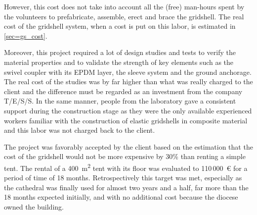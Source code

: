 However, this cost does not take into account all the (free) man-hours spent by the volunteers to prefabricate, assemble, erect and brace the gridshell. The real cost of the gridshell system, when a cost is put on this labor, is estimated in \cref{sec=gs_cost}.

Moreover, this project required a lot of design studies and tests to verify the material properties and to validate the strength of key elements such as the swivel coupler with its EPDM layer, the sleeve system and the ground anchorage. The real cost of the studies was by far higher than what was really charged to the client and the difference must be regarded as an investment from the company T/E/S/S. In the same manner, people from the laboratory gave a consistent support during the construction stage as they were the only available experienced workers familiar with the construction of elastic gridshells in composite material \cite{Douthe2010a,Baverel2012} and this labor was not charged back to the client.

The project was favorably accepted by the client based on the estimation that the cost of the gridshell would not be more expensive by 30\% than renting a simple tent. The rental of a 400~m\textsuperscript{2} tent with its floor was evaluated to 110\,000~€ for a period of time of 18 months. Retrospectively this target was met, especially as the cathedral was finally used for almost two years and a half, far more than the 18 months expected initially, and with no additional cost because the diocese owned the building.


